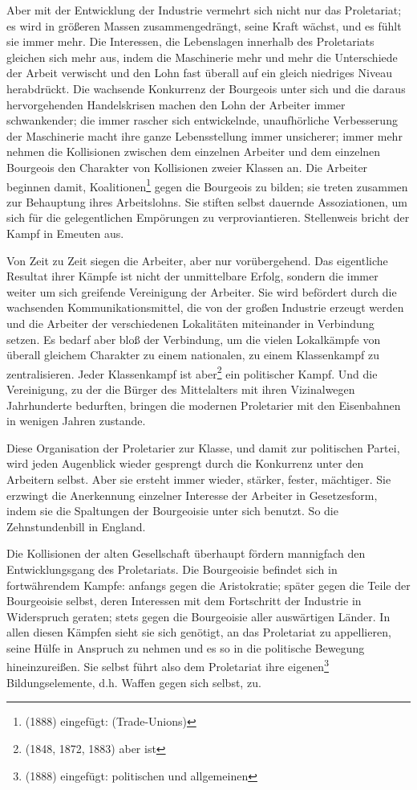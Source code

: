 \documentclass[letterpaper]{article}
\begin{document}
Aber mit der Entwicklung der Industrie vermehrt sich nicht nur das Proletariat; es wird in größeren Massen zusammengedrängt, seine Kraft wächst, und es fühlt sie immer mehr. Die Interessen, die Lebenslagen innerhalb des Proletariats gleichen sich mehr aus, indem die Maschinerie mehr und mehr die Unterschiede der Arbeit verwischt und den Lohn fast überall auf ein gleich niedriges Niveau herabdrückt. Die wachsende Konkurrenz der Bourgeois unter sich und die daraus hervorgehenden Handelskrisen machen den Lohn der Arbeiter immer schwankender; die immer rascher sich entwickelnde, unaufhörliche Verbesserung der Maschinerie macht ihre ganze Lebensstellung immer unsicherer; immer mehr nehmen die Kollisionen zwischen dem einzelnen Arbeiter und dem einzelnen Bourgeois den Charakter von Kollisionen zweier Klassen an. Die Arbeiter beginnen damit, Koalitionen\footnote{(1888) eingefügt: (Trade-Unions)} gegen die Bourgeois zu bilden; sie treten zusammen zur Behauptung ihres Arbeitslohns. Sie stiften selbst dauernde Assoziationen, um sich für die gelegentlichen Empörungen zu verproviantieren. Stellenweis bricht der Kampf in Emeuten aus.

Von Zeit zu Zeit siegen die Arbeiter, aber nur vorübergehend. Das eigentliche Resultat ihrer Kämpfe ist nicht der unmittelbare Erfolg, sondern die immer weiter um sich greifende Vereinigung der Arbeiter. Sie wird befördert durch die wachsenden Kommunikationsmittel, die von der großen Industrie erzeugt werden und die Arbeiter der verschiedenen Lokalitäten miteinander in Verbindung setzen. Es bedarf aber bloß der Verbindung, um die vielen Lokalkämpfe von überall gleichem Charakter zu einem nationalen, zu einem Klassenkampf zu zentralisieren. Jeder Klassenkampf ist aber\footnote{(1848, 1872, 1883) aber ist} ein politischer Kampf. Und die Vereinigung, zu der die Bürger des Mittelalters mit ihren Vizinalwegen Jahrhunderte bedurften, bringen die modernen Proletarier mit den Eisenbahnen in wenigen Jahren zustande.

Diese Organisation der Proletarier zur Klasse, und damit zur politischen Partei, wird jeden Augenblick wieder gesprengt durch die Konkurrenz unter den Arbeitern selbst. Aber sie ersteht immer wieder, stärker, fester, mächtiger. Sie erzwingt die Anerkennung einzelner Interesse der Arbeiter in Gesetzesform, indem sie die Spaltungen der Bourgeoisie unter sich benutzt. So die Zehnstundenbill in England.

Die Kollisionen der alten Gesellschaft überhaupt fördern mannigfach den Entwicklungsgang des Proletariats. Die Bourgeoisie befindet sich in fortwährendem Kampfe: anfangs gegen die Aristokratie; später gegen die Teile der Bourgeoisie selbst, deren Interessen mit dem Fortschritt der Industrie in Widerspruch geraten; stets gegen die Bourgeoisie aller auswärtigen Länder. In allen diesen Kämpfen sieht sie sich genötigt, an das Proletariat zu appellieren, seine Hülfe in Anspruch zu nehmen und es so in die politische Bewegung hineinzureißen. Sie selbst führt also dem Proletariat ihre eigenen\footnote{(1888) eingefügt: politischen und allgemeinen} Bildungselemente, d.h. Waffen gegen sich selbst, zu.
\end{document}
